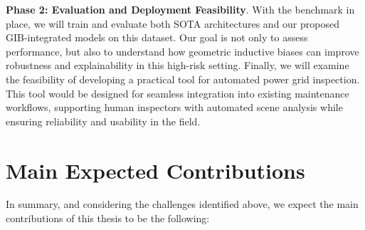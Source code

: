 \textbf{Phase 2: Evaluation and Deployment Feasibility}.
With the benchmark in place, we will train and evaluate both SOTA architectures
and our proposed GIB-integrated models on this dataset.
Our goal is not only to assess performance, but also to
understand how geometric inductive biases can improve robustness and
explainability in this high-risk setting.
%
Finally, we will examine the feasibility of developing a practical tool for
automated power grid inspection. This tool would be designed for seamless
integration into existing maintenance workflows, supporting human inspectors
with automated scene analysis while ensuring reliability and usability in the
field.

\section{Main Expected Contributions}

In summary, and considering the challenges identified above, we expect the main
contributions of this thesis to be the following:

